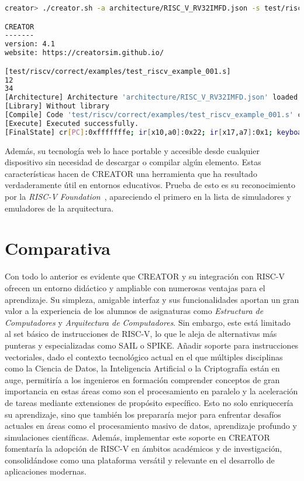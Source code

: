 \vfill
\vspace{0.5cm}
\begin{lstlisting}[caption=Interfaz por línea de comandos de CREATORa, label={lst:creator-cli}, language=bash]
creator> ./creator.sh -a architecture/RISC_V_RV32IMFD.json -s test/riscv/correct/examples/test_riscv_example_001.s

CREATOR
-------
version: 4.1
website: https://creatorsim.github.io/

[test/riscv/correct/examples/test_riscv_example_001.s]
12
34
[Architecture] Architecture 'architecture/RISC_V_RV32IMFD.json' loaded successfully.
[Library] Without library
[Compile] Code 'test/riscv/correct/examples/test_riscv_example_001.s' compiled successfully.
[Execute] Executed successfully.
[FinalState] cr[PC]:0xfffffffe; ir[x10,a0]:0x22; ir[x17,a7]:0x1; keyboard[0x0]:''; display[0x0]:'1234';
\end{lstlisting}

Además, su tecnología web lo hace portable y accesible desde cualquier
dispositivo sin necesidad de descargar o compilar algún elemento. Estas
características hacen de CREATOR una herramienta que ha resultado
verdaderamente útil en entornos educativos. Prueba de esto es su reconocimiento
por la \textit{RISC-V Foundation}~\cite{creator-riscvFoundation}, apareciendo
el primero en la lista de simuladores y emuladores de la arquitectura.


\section{Comparativa}

Con todo lo anterior es evidente que CREATOR y su integración con RISC-V
ofrecen un entorno didáctico y ampliable con numerosas ventajas para el
aprendizaje. Su simpleza, amigable interfaz y sus funcionalidades aportan un
gran valor a la experiencia de los alumnos de asignaturas como
\textit{Estructura de Computadores} y \textit{Arquitectura de Computadores}.
Sin embargo, este está limitado al set básico de instrucciones de RISC-V, lo
que le aleja de alternativas más punteras y especializadas como SAIL o SPIKE\@.
Añadir soporte para instrucciones vectoriales, dado el contexto tecnológico
actual en el que múltiples disciplinas como la Ciencia de Datos, la Inteligencia Artificial o la Criptografía
están en auge, permitiría a los ingenieros en formación comprender conceptos de gran importancia en estas áreas
como son el procesamiento en paralelo y la aceleración de tareas mediante
extensiones de propósito específico. Esto no solo enriquecería su aprendizaje,
sino que también los prepararía mejor para enfrentar desafíos actuales en áreas
como el procesamiento masivo de datos, aprendizaje profundo y simulaciones
científicas. Además, implementar este soporte en CREATOR fomentaría la adopción
de RISC-V en ámbitos académicos y de investigación, consolidándose como una
plataforma versátil y relevante en el desarrollo de aplicaciones modernas.

